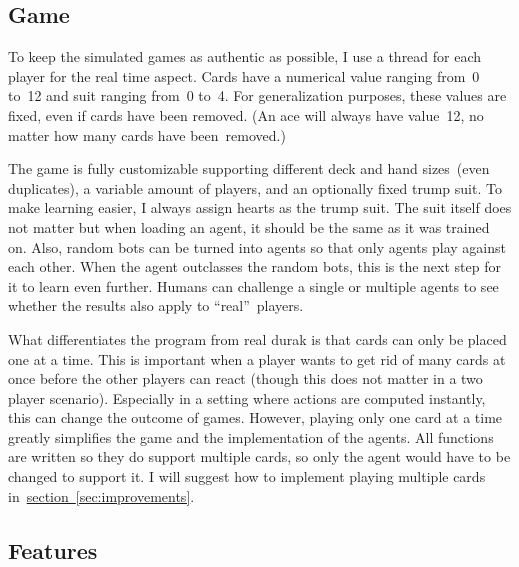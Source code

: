 \documentclass[a4paper,titlepage]{article}
\begin{document}
\subsection{Game}

To keep the simulated games as authentic as possible, I use a thread for each player for the real time aspect. Cards have a numerical value ranging from~0 to~12 and suit ranging from~0 to~4. For generalization purposes, these values are fixed, even if cards have been removed. (An ace will always have value~12, no matter how many cards have been~removed.)

The game is fully customizable supporting different deck and hand sizes~(even duplicates), a variable amount of players, and an optionally fixed trump suit. To make learning easier, I always assign hearts as the trump suit. The suit itself does not matter but when loading an agent, it should be the same as it was trained on. Also, random bots can be turned into agents so that only agents play against each other. When the agent outclasses the random bots, this is the next step for it to learn even further. Humans can challenge a single or multiple agents to see whether the results also apply to ``real''~players. 

What differentiates the program from real durak is that cards can only be placed one at a time. This is important when a player wants to get rid of many cards at once before the other players can react (though this does not matter in a two player scenario). Especially in a setting where actions are computed instantly, this can change the outcome of games. However, playing only one card at a time greatly simplifies the game and the implementation of the agents. All functions are written so they do support multiple cards, so only the agent would have to be changed to support it. I will suggest how to implement playing multiple cards in~\hyperref[sec:improvements]{section~\ref*{sec:improvements}}.

\subsection{Features}
\end{document}
